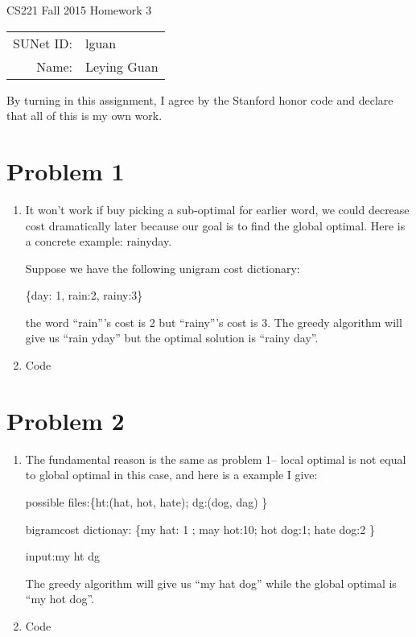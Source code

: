 \documentclass[12pt]{article}
\begin{document}
\begin{center}
{\Large CS221 Fall 2015 Homework 3}

\begin{tabular}{rl}
SUNet ID: & lguan \\
Name: & Leying Guan \\
\end{tabular}
\end{center}

By turning in this assignment, I agree by the Stanford honor code and declare
that all of this is my own work.

\section*{Problem 1}

\begin{enumerate}[label=(\alph*)]
  \item It won't work if buy picking a sub-optimal for earlier word, we could
decrease cost dramatically later because our goal is to find the global optimal.
Here is a concrete example: rainyday.

Suppose we have the following unigram cost dictionary:

\{day: 1, rain:2, rainy:3\}

the word ``rain'''s cost is 2 but ``rainy'''s cost is 3. The greedy
algorithm will give us ``rain yday'' but the optimal solution is ``rainy day''. 
\item Code
\end{enumerate}
\section*{Problem 2}

\begin{enumerate}[label=(\alph*)]
\item The fundamental reason is the same as problem 1-- local optimal is not
equal to global optimal in this case, and here is a example I give:

possible files:\{ht:(hat, hot, hate); dg:(dog, dag) \}

bigramcost dictionay: \{my hat: 1 ; may hot:10; hot dog:1; hate dog:2 \}

input:my ht dg

The greedy algorithm will give us ``my hat dog'' while the global optimal is
``my hot dog''.
\item Code
\end{enumerate}
\end{document}

